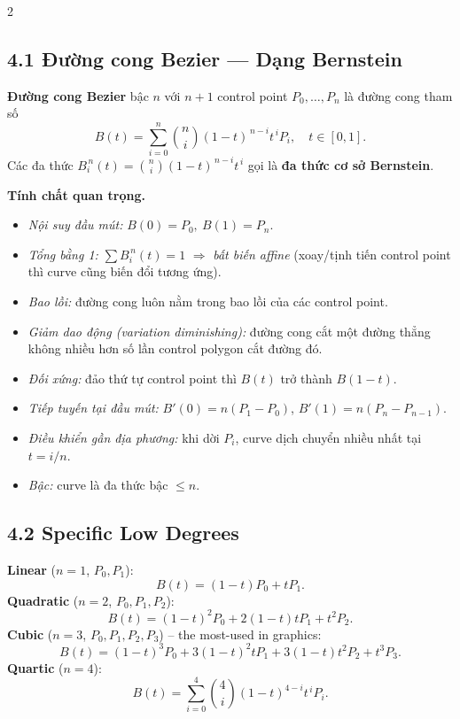 \begin{paracol}{2}
\switchcolumn

\subsection*{4.1 Đường cong Bezier --- Dạng Bernstein}

\textbf{Đường cong Bezier} bậc $n$ với $n{+}1$ control point $P_0,\dots,P_n$ là đường cong tham số
\[
B(t)=\sum_{i=0}^{n}\binom{n}{i}(1-t)^{\,n-i}t^{\,i}P_i,\quad t\in[0,1].
\]
Các đa thức $B_i^{\,n}(t)=\binom{n}{i}(1-t)^{\,n-i}t^{\,i}$ gọi là \textbf{đa thức cơ sở Bernstein}.

\textbf{Tính chất quan trọng.}
\begin{itemize}[leftmargin=*,nosep]
  \item \emph{Nội suy đầu mút:} $B(0)=P_0,\ B(1)=P_n$.
  \item \emph{Tổng bằng 1:} $\sum B_i^{\,n}(t)=1$ $\Rightarrow$ \emph{bất biến affine} (xoay/tịnh tiến control point thì curve cũng biến đổi tương ứng).
  \item \emph{Bao lồi:} đường cong luôn nằm trong bao lồi của các control point.
  \item \emph{Giảm dao động (variation diminishing):} đường cong cắt một đường thẳng không nhiều hơn số lần control polygon cắt đường đó.
  \item \emph{Đối xứng:} đảo thứ tự control point thì $B(t)$ trở thành $B(1{-}t)$.
  \item \emph{Tiếp tuyến tại đầu mút:}
        $B'(0)=n(P_1-P_0)$, $B'(1)=n(P_n-P_{n-1})$.
  \item \emph{Điều khiển gần địa phương:} khi dời $P_i$, curve dịch chuyển nhiều nhất tại $t=i/n$.
  \item \emph{Bậc:} curve là đa thức bậc $\le n$.
\end{itemize}

\switchcolumn*

\subsection*{4.2 Specific Low Degrees}

\textbf{Linear} ($n=1$, $P_0,P_1$):
\[
B(t)=(1-t)P_0+tP_1.
\]
\textbf{Quadratic} ($n=2$, $P_0,P_1,P_2$):
\[
B(t)=(1-t)^{2}P_0+2(1-t)tP_1+t^{2}P_2.
\]
\textbf{Cubic} ($n=3$, $P_0,P_1,P_2,P_3$) -- the most-used in graphics:
\[
B(t)=(1-t)^{3}P_0+3(1-t)^{2}tP_1+3(1-t)t^{2}P_2+t^{3}P_3.
\]
\textbf{Quartic} ($n=4$):
\[
B(t)=\sum_{i=0}^{4}\binom{4}{i}(1-t)^{4-i}t^{\,i}P_i.
\]


\end{paracol}
